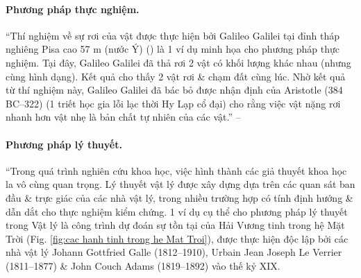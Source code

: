 \documentclass[oneside]{book}
\numberwithin{equation}{section}
\begin{document}
\paragraph{Phương pháp thực nghiệm.} ``Thí nghiệm về sự rơi của vật được thực hiện bởi Galileo Galilei tại đỉnh tháp nghiêng Pisa cao 57 m (nước Ý) (\cite[Hình 1.3: \textsf{Galileo Galilei (1564--1642) \& tháp nghiêng Pisa.}, p. 6]{SGK_Vat_Ly_10_Chan_Troi_Sang_Tao}) là 1 ví dụ minh họa cho phương pháp thực nghiệm. Tại đây, Galileo Galilei đã thả rơi 2 vật có khối lượng khác nhau (nhưng cùng hình dạng). Kết quả cho thấy 2 vật rơi \& chạm đất cùng lúc. Nhờ kết quả từ thí nghiệm này, Galileo Galilei đã bác bỏ được nhận định của Aristotle (384 BC--322) (1 triết học gia lỗi lạc thời Hy Lạp cổ đại) cho rằng việc vật nặng rơi nhanh hơn vật nhẹ là bản chất tự nhiên của các vật.'' -- \cite[pp. 6--7]{SGK_Vat_Ly_10_Chan_Troi_Sang_Tao}

\paragraph{Phương pháp lý thuyết.} ``Trong quá trình nghiên cứu khoa học, việc hình thành các giả thuyết khoa học la vô cùng quan trọng. Lý thuyết vật lý được xây dựng dựa trên các quan sát ban đầu \& trực giác của các nhà vật lý, trong nhiều trường hợp có tính định hướng \& dẫn dắt cho thực nghiệm kiểm chứng. 1 ví dụ cụ thể cho phương pháp lý thuyết trong Vật lý là công trình dự đoán sự tồn tại của Hải Vương tinh trong hệ Mặt Trời (Fig. \ref{fig:cac hanh tinh trong he Mat Troi}), được thực hiện độc lập bởi các nhà vật lý Johann Gottfried Galle (1812--1910), Urbain Jean Joseph Le Verrier (1811--1877) \& John Couch Adams (1819--1892) vào thế kỷ XIX.
\end{document}
